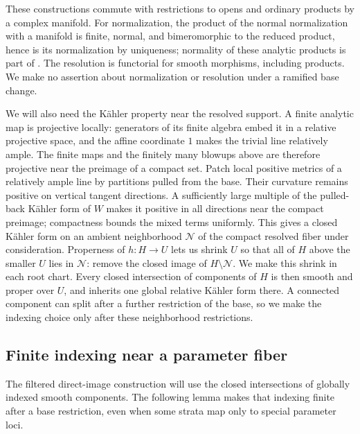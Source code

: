 These constructions commute with restrictions to opens and ordinary
products by a complex manifold.  For normalization, the product of the
normal normalization with a manifold is finite, normal, and bimeromorphic
to the reduced product, hence is its normalization by uniqueness;
normality of these analytic products is part of
\cite[Part~C, Theorem~4(b)]{Houzel1961}.
The resolution is functorial for smooth morphisms, including products.
We make no assertion about normalization or resolution under a ramified
base change.

We will also need the K\"ahler property near the resolved support.  A finite
analytic map is projective locally: generators of its finite algebra embed
it in a relative projective space, and the affine coordinate \(1\) makes
the trivial line relatively ample.  The finite maps and the finitely many
blowups above are therefore projective near the preimage of a compact set.
Patch local positive metrics of a relatively ample line by partitions
pulled from the base.  Their curvature remains positive on vertical tangent
directions.  A sufficiently large multiple of the pulled-back K\"ahler
form of \(W\) makes it positive in all directions near the compact
preimage; compactness bounds the mixed terms uniformly.  This gives a
closed K\"ahler form on an ambient neighborhood \(\mathcal N\) of the
compact resolved fiber under consideration.  Properness of \(h:H\to U\)
lets us shrink \(U\) so that all of \(H\) above the smaller \(U\) lies in
\(\mathcal N\): remove the closed image of \(H\setminus\mathcal N\).
We make this shrink in each root chart.  Every closed intersection of
components of \(H\) is then smooth and proper over \(U\), and inherits
one global relative K\"ahler form there.  A connected component can split
after a further restriction of the base, so we make the indexing choice
only after these neighborhood restrictions.

\subsection{Finite indexing near a parameter fiber}

The filtered direct-image construction will use the closed intersections
of globally indexed smooth components.  The following lemma makes that
indexing finite after a base restriction, even when some strata map only
to special parameter loci.

